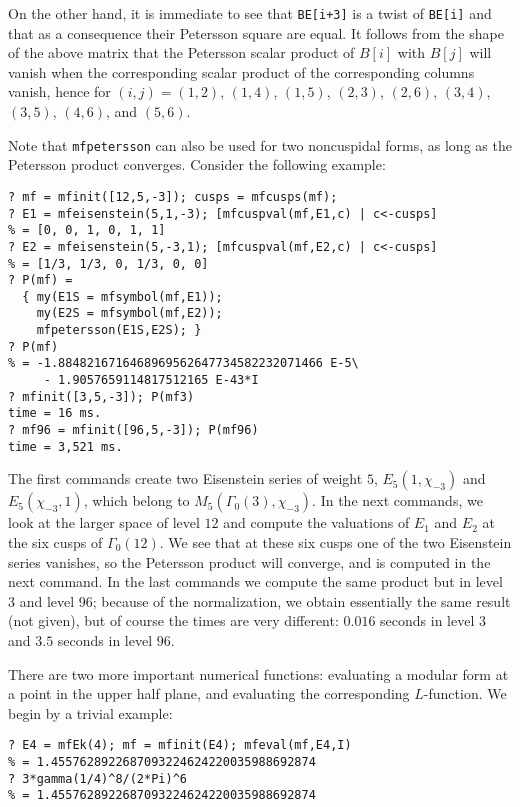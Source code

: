 \documentclass[11pt]{article}
\newcommand{\G}{\Gamma}
\def\kbd#1{{\tt #1}}
\begin{document}
On the other hand, it is immediate to see that \kbd{BE[i+3]} is a twist of
\kbd{BE[i]} and that as a consequence their Petersson square are equal. It
follows from the shape of the above matrix that the Petersson scalar product
of $B[i]$ with $B[j]$ will vanish when the corresponding scalar product of
the corresponding columns vanish, hence for $(i,j)=(1,2)$, $(1,4)$, $(1,5)$,
$(2,3)$, $(2,6)$, $(3,4)$, $(3,5)$, $(4,6)$, and $(5,6)$.

\smallskip

Note that \kbd{mfpetersson} can also be used for two noncuspidal forms, as
long as the Petersson product converges. Consider the following example:

\begin{verbatim}
? mf = mfinit([12,5,-3]); cusps = mfcusps(mf);
? E1 = mfeisenstein(5,1,-3); [mfcuspval(mf,E1,c) | c<-cusps]
% = [0, 0, 1, 0, 1, 1]
? E2 = mfeisenstein(5,-3,1); [mfcuspval(mf,E2,c) | c<-cusps]
% = [1/3, 1/3, 0, 1/3, 0, 0]
? P(mf) =
  { my(E1S = mfsymbol(mf,E1));
    my(E2S = mfsymbol(mf,E2));
    mfpetersson(E1S,E2S); }
? P(mf)
% = -1.8848216716468969562647734582232071466 E-5\
     - 1.9057659114817512165 E-43*I
? mfinit([3,5,-3]); P(mf3)
time = 16 ms.
? mf96 = mfinit([96,5,-3]); P(mf96)
time = 3,521 ms.
\end{verbatim}

The first commands create two Eisenstein series of weight $5$,
$E_5(1,\chi_{-3})$ and $E_5(\chi_{-3},1)$, which belong to
$M_5(\G_0(3),\chi_{-3})$. In the next commands, we look at the larger space of
level $12$ and compute the valuations of $E_1$ and $E_2$ at the six cusps of
$\G_0(12)$. We see that at these six cusps one of the two Eisenstein series
vanishes, so the Petersson product will converge, and is computed in the
next command. In the last commands we compute the same product but in level
$3$ and level $96$; because of the normalization, we obtain essentially the
same result (not given), but of course the times are very different: $0.016$
seconds in level $3$ and $3.5$ seconds in level $96$.

\medskip

There are two more important numerical functions: evaluating a modular form
at a point in the upper half plane, and evaluating the corresponding
$L$-function. We begin by a trivial example:

\begin{verbatim}
? E4 = mfEk(4); mf = mfinit(E4); mfeval(mf,E4,I)
% = 1.4557628922687093224624220035988692874
? 3*gamma(1/4)^8/(2*Pi)^6
% = 1.4557628922687093224624220035988692874
\end{verbatim}
\end{document}
